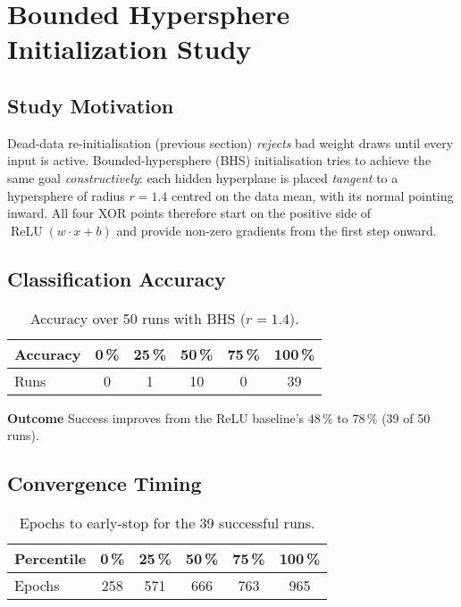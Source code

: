 \section{Bounded Hypersphere Initialization Study}
\label{sec:relu1-bounded-hypersphere}

\subsection*{Study Motivation}
Dead-data re-initialisation (previous section) \emph{rejects} bad weight
draws until every input is active.  
Bounded-hypersphere (BHS) initialisation tries to achieve the same goal
\emph{constructively}: each hidden hyperplane is placed
\emph{tangent} to a hypersphere of radius $r=1.4$
centred on the data mean, with its normal pointing inward.
All four XOR points therefore start on the positive side of
\(\operatorname{ReLU}(w\!\cdot\!x+b)\) and provide non-zero gradients
from the first step onward.

\subsection*{Classification Accuracy}

\begin{table}[ht]
\centering
\caption{Accuracy over 50 runs with BHS ($r=1.4$).}
\label{tab:relu1-bhs-accuracy}
\begin{tabular}{lccccc}
\toprule
Accuracy & 0\,\% & 25\,\% & 50\,\% & 75\,\% & 100\,\% \\
\midrule
Runs & 0 & 1 & 10 & 0 & 39 \\
\bottomrule
\end{tabular}
\end{table}

\textbf{Outcome}
Success improves from the ReLU baseline's $48\,\%$ to $78\,\%$ (39 of 50 runs).

\subsection*{Convergence Timing}

\begin{table}[ht]
\centering
\caption{Epochs to early-stop for the 39 successful runs.}
\label{tab:relu1-bhs-epochs}
\begin{tabular}{lccccc}
\toprule
Percentile & 0\,\% & 25\,\% & 50\,\% & 75\,\% & 100\,\% \\
\midrule
Epochs & 258 & 571 & 666 & 763 & 965\\
\bottomrule
\end{tabular}
\end{table}

